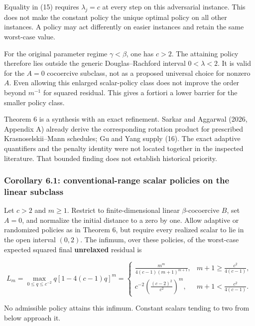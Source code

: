 \documentclass[
  british,
  11pt,
  a4paper,
]{article}
\begin{document}
Equality in (15) requires \(\lambda_j=c\) at every step on this
adversarial instance. This does not make the constant policy the unique
optimal policy on all other instances. A policy may act differently on
easier instances and retain the same worst-case value.

For the original parameter regime \(\gamma<\beta\), one has \(c>2\). The
attaining policy therefore lies outside the generic Douglas--Rachford
interval \(0<\lambda<2\). It is valid for the \(A=0\) cocoercive
subclass, not as a proposed universal choice for nonzero \(A\). Even
allowing this enlarged scalar-policy class does not improve the order
beyond \(m^{-1}\) for squared residual. This gives a fortiori a lower
barrier for the smaller policy class.

Theorem 6 is a synthesis with an exact refinement. Sarkar and Aggarwal
(2026, Appendix A) already derive the corresponding rotation product for
prescribed Krasnoselskii--Mann schedules; Gu and Yang supply (16). The
exact adaptive quantifiers and the penalty identity were not located
together in the inspected literature. That bounded finding does not
establish historical priority.

\subsubsection{Corollary 6.1: conventional-range scalar policies on the
linear
subclass}\label{corollary-6.1-conventional-range-scalar-policies-on-the-linear-subclass}

Let \(c>2\) and \(m\geq1\). Restrict to finite-dimensional linear
\(\beta\)-cocoercive \(B\), set \(A=0\), and normalize the initial
distance to a zero by one. Allow adaptive or randomized policies as in
Theorem 6, but require every realized scalar to lie in the open interval
\((0,2)\). The infimum, over these policies, of the worst-case expected
squared final \textbf{unrelaxed} residual is

\[
L_m=\max_{0\leq q\leq c^{-2}}q[1-4(c-1)q]^m
=
\begin{cases}
\displaystyle\frac{m^m}{4(c-1)(m+1)^{m+1}},
&m+1\geq\displaystyle\frac{c^2}{4(c-1)},\\[6pt]
\displaystyle c^{-2}\left(\frac{(c-2)^2}{c^2}\right)^m,
&m+1<\displaystyle\frac{c^2}{4(c-1)}.
\end{cases}
\tag{16a}
\]

No admissible policy attains this infimum. Constant scalars tending to
two from below approach it.
\end{document}
